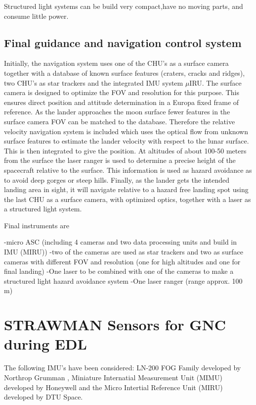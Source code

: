 Structured light systems can be build very compact,have no moving parts, and consume little power. 





\subsection{Final guidance and navigation control system}
Initially, the navigation system uses one of the CHU's as a surface camera together with a database of known surface
features (craters, cracks and ridges), two CHU's as star trackers and the integrated IMU system $\mu$IRU. The surface camera is designed to optimize the FOV and resolution for this purpose. This ensures direct position and attitude determination in a Europa fixed frame of reference.
As the lander approaches the moon surface fewer features in the surface camera FOV
can be matched to the database. Therefore the relative velocity navigation system is included
which uses the optical flow from unknown surface features to estimate
the lander velocity with respect to the lunar surface. This is then integrated to give the
position. At altitudes of about 100-50 meters from the surface the laser ranger is used to determine a precise height of the spacecraft relative to the surface. This information is used as hazard avoidance as to avoid deep gorges or steep hills. Finally, as the lander gets the intended landing area in sight, it will navigate
relative to a hazard free landing spot using the last CHU as a surface camera, with optimized optics, together with a laser as a structured light system. 

Final instruments are 

-micro ASC (including 4 cameras and two data processing units and build in IMU (MIRU))
-two of the cameras are used as star trackers and two as surface cameras with different FOV and resolution (one for high altitudes and one for final landing)
-One laser to be combined with one of the cameras to make a structured light hazard avoidance system
-One laser ranger (range approx. 100 m)


\section{STRAWMAN Sensors for GNC during EDL}

The following IMU's have been considered: 
LN-200 FOG Family developed by Northrop Grumman \cite{http://www.northropgrumman.com/Capabilities/LN200FOG/Documents/ln200.pdf}, Miniature Internatial Measurement Unit (MIMU) developed by Honeywell \cite{http://www51.honeywell.com/aero/common/documents/myaerospacecatalog-documents/MIMU.pdf} and the Micro Intertial Reference Unit (MIRU) developed by DTU Space. 

